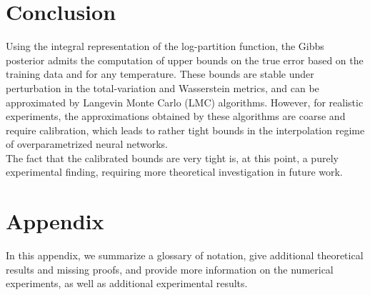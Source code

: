 \documentclass{article} %
\newcommand{\massi}[2][]{\todo[color=brown!20,#1]{{\bf MP:} #2}}
\begin{document}
\section{Conclusion}

Using the integral representation of the log-partition function, the
Gibbs posterior admits the computation of upper bounds on the true error based on the training data and for any temperature.  These bounds are stable
under perturbation in the total-variation and Wasserstein metrics, and can
be approximated by Langevin Monte Carlo (LMC) algorithms. However, for realistic experiments, the approximations obtained by these algorithms
are coarse and require calibration, which leads to rather tight bounds in the interpolation regime of overparametrized neural networks. \\
The fact that the calibrated bounds are very tight is, at this point, a purely experimental finding, requiring more theoretical investigation in future work.



\appendix
\section*{Appendix}

In this appendix, we summarize a glossary of notation, give additional theoretical results and missing proofs, and provide more information on the numerical experiments, as well as additional experimental results.
\end{document}
